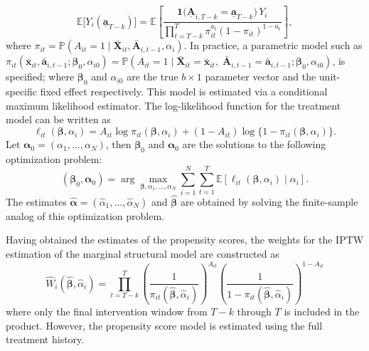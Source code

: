 \begin{equation}
    \label{eq:truncated_potential_outcome_id}
    \mathbb{E}\bigl[Y_i(\underline{\mathbf{a}}_{T-k})\bigr]
    =
    \mathbb{E}\left[
    \frac{\mathbf{1}\bigl(\underline{\mathbf{A}}_{i,T-k} = \underline{\mathbf{a}}_{T-k}\bigr)\, Y_i}
    {\prod_{t=T-k}^{T} \pi_{it}^{a_t} (1 - \pi_{it})^{1 - a_t}}
    \right],
\end{equation}
where $\pi_{it} = \mathbb{P}(A_{it} = 1 \mid \bar{\mathbf{X}}_{it}, \bar{\mathbf{A}}_{i,t-1}, \alpha_i)$.
In practice, a parametric model such as  
$
\pi_{it}(\bar{\mathbf{x}}_{it}, \bar{\mathbf{a}}_{i,t-1}; \boldsymbol{\beta}_0,\alpha_{i0})
=
\mathbb{P}\!\left(
A_{it}=1 \mid \bar{\mathbf{X}}_{it}=\bar{\mathbf{x}}_{it},\; \bar{\mathbf{A}}_{i,t-1}=\bar{\mathbf{a}}_{i,t-1}; \boldsymbol{\beta}_0, \alpha_{i0}
\right)$, 
is specified; where $\boldsymbol{\beta}_0$ and $\alpha_{i0}$ are the true $b \times 1$ parameter vector and 
the unit-specific fixed effect respectively. 
This model is estimated via a
conditional maximum likelihood estimator. 
The log-likelihood function for the treatment model can be written as 
\[
\ell_{it}(\boldsymbol{\beta},\alpha_{i})=A_{it}\log \pi_{it}(\boldsymbol{\beta},\alpha_{i}) + 
(1-A_{it})\log\{1-\pi_{it}(\boldsymbol{\beta},\alpha_{i})\}.
\]
Let $\boldsymbol{\alpha}_0 = (\alpha_{1}, \ldots, \alpha_{N})$, 
then $\boldsymbol{\beta}_0$ and $\boldsymbol{\alpha}_0$ 
are the solutions to the following optimization problem: 
\[ 
(\boldsymbol{\beta}_0, \boldsymbol{\alpha}_0)
= \arg\max_{\boldsymbol{\beta},\alpha_1,\ldots,\alpha_N}
\sum_{i=1}^{N}\sum_{t=1}^{T}
\mathbb{E}\!\left[\ell_{it}(\boldsymbol{\beta},\alpha_i)\mid \alpha_i\right].
\]
The estimates $\hat{\boldsymbol{\alpha}} = (\hat\alpha_1, \ldots, \hat\alpha_N)$ and $\hat{\boldsymbol{\beta}}$ are 
obtained by solving the finite-sample analog of this optimization problem. 

Having obtained the estimates of the propensity scores, the weights for the IPTW 
estimation of the marginal structural model are constructed as
\begin{equation}
\widehat{W}_i(\hat{\boldsymbol{\beta}},\hat{\alpha}_i)=\prod_{t=T-k}^{T}
\left(\frac{1}{\pi_{it}(\hat{\boldsymbol{\beta}},\hat{\alpha}_i)}\right)^{A_{it}}
\left(\frac{1}{1-\pi_{it}(\hat{\boldsymbol{\beta}},\hat{\alpha}_i)}\right)^{1-A_{it}}
\label{eq:iptw_weights}
\end{equation}
where only the final intervention window from $T-k$ through $T$ is included in the product. However, the 
propensity score model is estimated using the full treatment history. 

